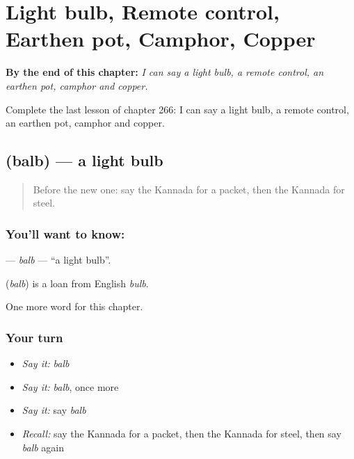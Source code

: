 
\chapter{Light bulb, Remote control, Earthen pot, Camphor, Copper}
\label{ch:ka-light-bulb-remote-control-earthen-pot-camphor-copper}

\begin{chapteropening}
\textbf{By the end of this chapter:} \emph{I can say a light bulb, a remote control, an earthen pot, camphor and copper.}

Complete the last lesson of chapter 266: I can say a light bulb, a remote control, an earthen pot, camphor and copper.
\end{chapteropening}

\section[\texorpdfstring{\kn{ಬಲ್ಬ್} (balb)}{ಬಲ್ಬ್ (balb)}]{ (balb) — a light bulb}

\label{lesson:KA-C266-balb}



\begin{quote}
Before the new one: say the Kannada for a packet, then the Kannada for steel.
\end{quote}

\subsection*{You'll want to know: }
\textbf{} — \emph{balb} — \textquotedblleft{}a light bulb\textquotedblright{}.

\begin{cousinweb}
\textbf{} (\emph{balb}) is a loan from English \emph{bulb}.
\end{cousinweb}

\begin{grammarlens}[title={What you've built}]
One more word for this chapter.
\end{grammarlens}

\subsection*{Your turn}
\begin{itemize}
\raggedright
  \item \emph{Say it:} \emph{balb}
  \item \emph{Say it:} \emph{balb}, once more
  \item \emph{Say it:} say \emph{balb}
  \item \emph{Recall:} say the Kannada for a packet, then the Kannada for steel, then say \emph{balb} again
\end{itemize}

